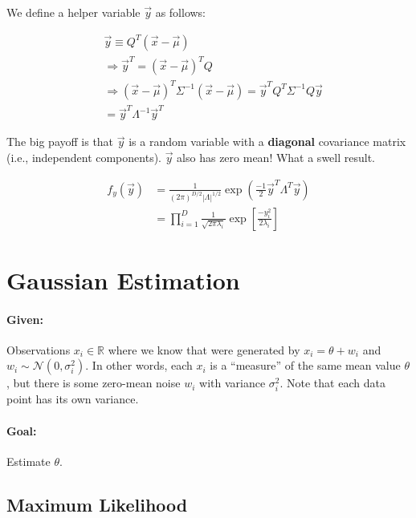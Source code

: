 \documentclass[a4paper,12pt]{report}
\begin{document}
We define a helper variable $\vec y$ as follows:

\begin{equation}
\begin{split}
& \vec y \equiv Q^T(\vec x - \vec \mu) \\
& \Rightarrow \vec y^T = (\vec x - \vec \mu)^T Q \\
& \Rightarrow (\vec x - \vec \mu)^T \Sigma^{-1} (\vec x - \vec \mu) = \vec y^T Q^T \Sigma^{-1} Q \vec y \\
&= \vec y^T \Lambda^{-1} \vec y^T
\end{split}
\end{equation}

The big payoff is that $\vec y$ is a random variable with a \textbf{diagonal} covariance matrix (i.e., independent components). $\vec y$ also has zero mean! What a swell result.

\begin{equation}
\begin{split}
f_y(\vec y) &= \frac{1}{(2\pi)^{D/2} |\Lambda|^{1/2}} \exp (\frac{-1}{2} \vec y^T \Lambda^T \vec y) \\
&= \prod_{i=1}^D \frac{1}{\sqrt{2\pi\lambda_i}} \exp[\frac{-y_i^2}{2\lambda_i}]
\end{split}
\end{equation}


\section{Gaussian Estimation}

\paragraph{Given: } Observations $x_i\in \mathbb R$ where we know that were generated by $x_i = \theta + w_i$ and $w_i \sim \mathcal N(0, \sigma_i^2)$. In other words, each $x_i$ is a ``measure'' of the same mean value $\theta$, but there is some zero-mean noise $w_i$ with variance $\sigma_i^2$. Note that each data point has its own variance. 

\paragraph{Goal: } Estimate $\theta$.

\subsection{Maximum Likelihood}
\end{document}
